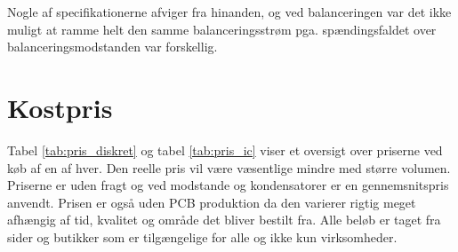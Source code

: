 Nogle af specifikationerne afviger fra hinanden, og ved balanceringen var det ikke muligt at ramme helt den samme balanceringsstrøm pga. spændingsfaldet over balanceringsmodstanden var forskellig. 

\section{Kostpris} \label{sec:sammenligning_kostpris}

Tabel \ref{tab:pris_diskret} og tabel \ref{tab:pris_ic} viser et oversigt over priserne ved køb af en af hver. Den reelle pris vil være væsentlige mindre med større volumen. Priserne er uden fragt og ved modstande og kondensatorer er en gennemsnitspris anvendt. Prisen er også uden PCB produktion da den varierer rigtig meget afhængig af tid, kvalitet og område det bliver bestilt fra. Alle beløb er taget fra sider og butikker som er tilgængelige for alle og ikke kun virksomheder. 


